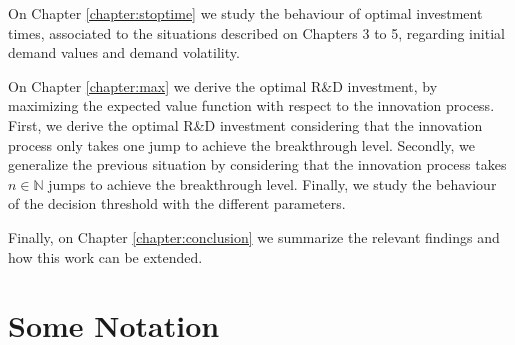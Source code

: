 On Chapter \ref{chapter:stoptime} we study the behaviour of optimal investment times, associated to the situations described on Chapters 3 to 5, regarding initial demand values and demand volatility.



On Chapter \ref{chapter:max} we derive the optimal R\&D investment, by maximizing the expected value function with respect to the innovation process. 
First, we derive the optimal R\&D investment considering that the innovation process only takes one jump to achieve the breakthrough level.
Secondly, we generalize the previous situation by considering that the innovation process takes $n \in \mathds{N}$ jumps to achieve the breakthrough level.
Finally, we study the behaviour of the decision threshold with the different parameters.



Finally, on Chapter \ref{chapter:conclusion} we summarize the relevant findings and how this work can be extended.




\section{Some Notation}
\label{intro:notation}

